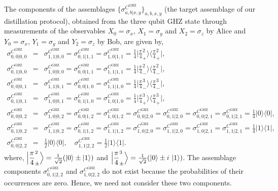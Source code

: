 \documentclass[reprint,superscriptaddress,nofootinbib,amsmath,amssymb,aps,pra,longbibliography]{revtex4-1}
\begin{document}
\begin{widetext}
The components of the assemblages $\{\sigma_{a,b|x,y}^{C^{\text{GHZ}}}\}_{a,b,x,y}$ (the target assemblage of our distillation protocol), obtained from the three qubit GHZ state through measurements of the observables $X_0= \sigma_x$, $X_1=\sigma_y$ and $X_2=\sigma_z$ by Alice and $Y_0= \sigma_x$, $Y_1=\sigma_y$ and $Y_2=\sigma_z$ by Bob, are given by,
\begin{eqnarray}
	\sigma_{0,0|0,0}^{C^{\text{GHZ}}} &=& \sigma_{1,1|0,0}^{C^{\text{GHZ}}} = \sigma_{0,1|1,1}^{C^{\text{GHZ}}} = \sigma_{1,0|1,1}^{C^{\text{GHZ}}} = \frac{1}{4} \Bigg| \frac{\pi}{4}_+^2 \Bigg\rangle \Bigg\langle \frac{\pi}{4}_+^2 \Bigg|, \nonumber \\ 
	\sigma_{0,1|0,0}^{C^{\text{GHZ}}} &=& \sigma_{1,0|0,0}^{C^{\text{GHZ}}} = \sigma_{0,0|1,1}^{C^{\text{GHZ}}} = \sigma_{1,1|1,1}^{C^{\text{GHZ}}} = \frac{1}{4} \Bigg| \frac{\pi}{4}_-^2 \Bigg\rangle \Bigg\langle \frac{\pi}{4}_-^2 \Bigg|, \nonumber \\ 
    \sigma_{0,0|0,1}^{C^{\text{GHZ}}} &=& \sigma_{1,1|0,1}^{C^{\text{GHZ}}} = \sigma_{0,0|1,0}^{C^{\text{GHZ}}} = \sigma_{1,1|1,0}^{C^{\text{GHZ}}} = \frac{1}{4} \Bigg| \frac{\pi}{4}_-^3 \Bigg\rangle \Bigg\langle \frac{\pi}{4}_-^3 \Bigg|, \nonumber \\ 
    \sigma_{0,1|0,1}^{C^{\text{GHZ}}} &=& \sigma_{1,0|0,1}^{C^{\text{GHZ}}} = \sigma_{0,1|1,0}^{C^{\text{GHZ}}} = \sigma_{1,0|1,0}^{C^{\text{GHZ}}} = \frac{1}{4} \Bigg| \frac{\pi}{4}_+^3 \Bigg\rangle \Bigg\langle \frac{\pi}{4}_+^3 \Bigg|, \nonumber \\
    \sigma_{0,0|0,2}^{C^{\text{GHZ}}} &=& \sigma_{1,0|0,2}^{C^{\text{GHZ}}} = \sigma_{0,0|1,2}^{C^{\text{GHZ}}} = \sigma_{1,0|1,2}^{C^{\text{GHZ}}} = \sigma_{0,0|2,0}^{C^{\text{GHZ}}} = \sigma_{0,1|2,0}^{C^{\text{GHZ}}} = \sigma_{0,0|2,1}^{C^{\text{GHZ}}} = \sigma_{0,1|2,1}^{C^{\text{GHZ}}} =  \frac{1}{4} | 0\rangle \langle 0 |, \nonumber \\
    \sigma_{0,1|0,2}^{C^{\text{GHZ}}} &=& \sigma_{1,1|0,2}^{C^{\text{GHZ}}} = \sigma_{0,1|1,2}^{C^{\text{GHZ}}} = \sigma_{1,1|1,2}^{C^{\text{GHZ}}} = \sigma_{1,0|2,0}^{C^{\text{GHZ}}} = \sigma_{1,1|2,0}^{C^{\text{GHZ}}} = \sigma_{1,0|2,1}^{C^{\text{GHZ}}} = \sigma_{1,1|2,1}^{C^{\text{GHZ}}} =  \frac{1}{4} | 1 \rangle \langle 1 |, \nonumber \\
	\sigma_{0,0|2,2}^{C^{\text{GHZ}}} &=& \frac{1}{2} | 0 \rangle \langle 0 |,\quad  \sigma_{1,1|2,2}^{C^{\text{GHZ}}} = \frac{1}{2} | 1 \rangle \langle 1 |.
	\label{GHZ2Sassemblage}
\end{eqnarray}
where, $\Big| \dfrac{\pi}{4}_{\pm}^2 \Big\rangle = \frac{1}{\sqrt{2}}(\ket{0} \pm \ket{1})$ and $\Big| \dfrac{\pi}{4}_{\pm}^3 \Big\rangle = \frac{1}{\sqrt{2}}(\ket{0} \pm i \, \ket{1})$. The assemblage components $\sigma_{0,1|2,2}^{C^{\text{GHZ}}}$ and  $\sigma_{1,0|2,2}^{C^{\text{GHZ}}}$ do not exist because the probabilities of their occurrences are  zero. Hence, we need not consider these two components.


\end{widetext}
\end{document}
